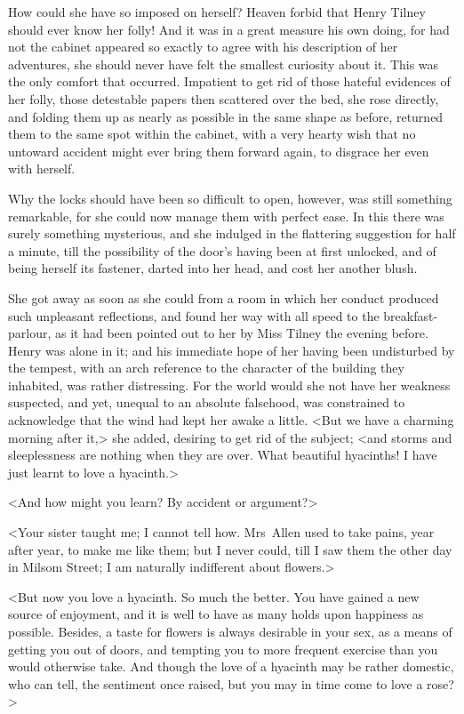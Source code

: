  How could she have so imposed on herself? Heaven forbid that Henry Tilney should ever know her folly! And it was in a great measure his own doing, for had not the cabinet appeared so exactly to agree with his description of her adventures, she should never have felt the smallest curiosity about it. This was the only comfort that occurred. Impatient to get rid of those hateful evidences of her folly, those detestable papers then scattered over the bed, she rose directly, and folding them up as nearly as possible in the same shape as before, returned them to the same spot within the cabinet, with a very hearty wish that no untoward accident might ever bring them forward again, to disgrace her even with herself. 

 Why the locks should have been so difficult to open, however, was still something remarkable, for she could now manage them with perfect ease. In this there was surely something mysterious, and she indulged in the flattering suggestion for half a minute, till the possibility of the door's having been at first unlocked, and of being herself its fastener, darted into her head, and cost her another blush. 

 She got away as soon as she could from a room in which her conduct produced such unpleasant reflections, and found her way with all speed to the breakfast-parlour, as it had been pointed out to her by Miss Tilney the evening before. Henry was alone in it; and his immediate hope of her having been undisturbed by the tempest, with an arch reference to the character of the building they inhabited, was rather distressing. For the world would she not have her weakness suspected, and yet, unequal to an absolute falsehood, was constrained to acknowledge that the wind had kept her awake a little. <But we have a charming morning after it,> she added, desiring to get rid of the subject; <and storms and sleeplessness are nothing when they are over. What beautiful hyacinths! I have just learnt to love a hyacinth.> 

 <And how might you learn? By accident or argument?> 

 <Your sister taught me; I cannot tell how. Mrs~Allen used to take pains, year after year, to make me like them; but I never could, till I saw them the other day in Milsom Street; I am naturally indifferent about flowers.> 

 <But now you love a hyacinth. So much the better. You have gained a new source of enjoyment, and it is well to have as many holds upon happiness as possible. Besides, a taste for flowers is always desirable in your sex, as a means of getting you out of doors, and tempting you to more frequent exercise than you would otherwise take. And though the love of a hyacinth may be rather domestic, who can tell, the sentiment once raised, but you may in time come to love a rose?> 

